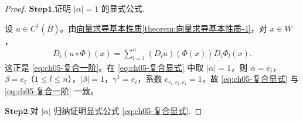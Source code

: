 \documentclass[../../main.tex]{subfiles}
\begin{document}
\begin{proof}
\noindent$\mathbf{Step}\bm{1}$.{\heiti 证明 $|\alpha|=1$ 的显式公式.}

设 $u\in C^{1}(\overline{B})$。由\hyperref[theorem:向量求导基本性质]{向量求导基本性质\ref{theorem:向量求导基本性质-4}}，对 $x\in W$，
\begin{align*}
D_i(u\circ\Phi)(x)=\sum_{l=1}^{n}(D_lu)(\Phi(x))D_i\Phi_l(x).
\end{align*}
这正是 \eqref{eq:ch05-复合一阶}。在 \eqref{eq:ch05-复合显式} 中取 $|\alpha|=1$，则 $\alpha=e_i$，$\beta=e_l$（$1\leqslant l\leqslant n$），$|\beta|=1$，$\gamma^{1}=e_i$，系数 $c_{e_i,e_l,e_i}=1$，故 \eqref{eq:ch05-复合显式} 与 \eqref{eq:ch05-复合一阶} 一致。

\noindent$\mathbf{Step}\bm{2}$.{\heiti 对 $|\alpha|$ 归纳证明显式公式 \eqref{eq:ch05-复合显式}.}


\end{proof}
\end{document}
